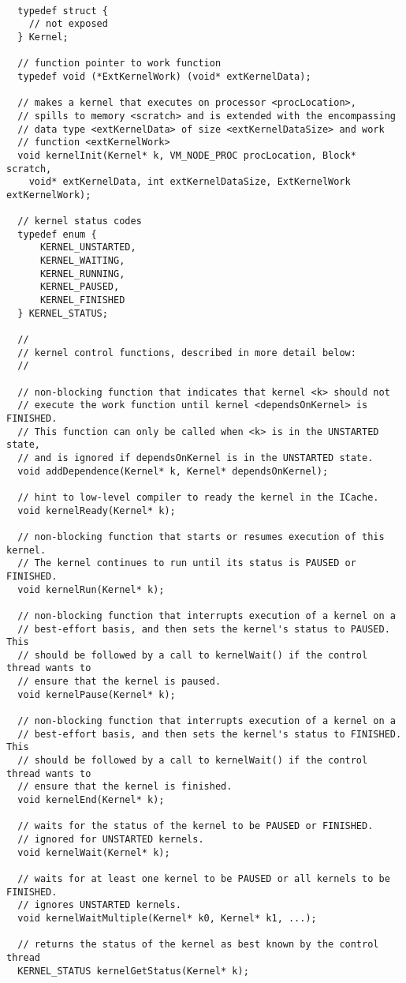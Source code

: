 {\small
\begin{verbatim}

  typedef struct {
    // not exposed
  } Kernel;

  // function pointer to work function
  typedef void (*ExtKernelWork) (void* extKernelData);

  // makes a kernel that executes on processor <procLocation>,
  // spills to memory <scratch> and is extended with the encompassing
  // data type <extKernelData> of size <extKernelDataSize> and work
  // function <extKernelWork>
  void kernelInit(Kernel* k, VM_NODE_PROC procLocation, Block* scratch,
    void* extKernelData, int extKernelDataSize, ExtKernelWork extKernelWork);

  // kernel status codes
  typedef enum {
      KERNEL_UNSTARTED,
      KERNEL_WAITING,
      KERNEL_RUNNING,
      KERNEL_PAUSED,
      KERNEL_FINISHED
  } KERNEL_STATUS;

  //
  // kernel control functions, described in more detail below:
  //

  // non-blocking function that indicates that kernel <k> should not 
  // execute the work function until kernel <dependsOnKernel> is FINISHED.  
  // This function can only be called when <k> is in the UNSTARTED state,
  // and is ignored if dependsOnKernel is in the UNSTARTED state.
  void addDependence(Kernel* k, Kernel* dependsOnKernel);

  // hint to low-level compiler to ready the kernel in the ICache.
  void kernelReady(Kernel* k);

  // non-blocking function that starts or resumes execution of this kernel. 
  // The kernel continues to run until its status is PAUSED or FINISHED.
  void kernelRun(Kernel* k);

  // non-blocking function that interrupts execution of a kernel on a
  // best-effort basis, and then sets the kernel's status to PAUSED.  This 
  // should be followed by a call to kernelWait() if the control thread wants to
  // ensure that the kernel is paused.
  void kernelPause(Kernel* k);

  // non-blocking function that interrupts execution of a kernel on a 
  // best-effort basis, and then sets the kernel's status to FINISHED.  This 
  // should be followed by a call to kernelWait() if the control thread wants to
  // ensure that the kernel is finished.
  void kernelEnd(Kernel* k);

  // waits for the status of the kernel to be PAUSED or FINISHED.
  // ignored for UNSTARTED kernels.
  void kernelWait(Kernel* k);

  // waits for at least one kernel to be PAUSED or all kernels to be FINISHED.
  // ignores UNSTARTED kernels.
  void kernelWaitMultiple(Kernel* k0, Kernel* k1, ...);

  // returns the status of the kernel as best known by the control thread
  KERNEL_STATUS kernelGetStatus(Kernel* k);
\end{verbatim}}

